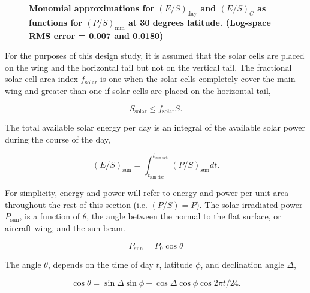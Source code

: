 \documentclass[]{aiaa-tc}%
\begin{document}
\begin{figure}[H]
 \begin{subfigmatrix}{2}%
 \end{subfigmatrix}
 \caption{\textbf{Monomial approximations for $(E/S)_{\text{day}}$ and $(E/S)_C$ as functions for $(P/S)_{\text{min}}$ at 30 degrees latitude. (Log-space RMS error = 0.007 and 0.0180)}}
 \label{f:energyapprox}
\end{figure}

For the purposes of this design study, it is assumed that the solar cells are placed on the wing and the horizontal tail but not on the vertical tail. 
The fractional solar cell area index $f_{\text{solar}}$ is one when the solar cells completely cover the main wing and greater than one if solar cells are placed on the horizontal tail,

\begin{equation}
    \label{e:solarssolar}
    S_{\text{solar}} \leq f_{\text{solar}}S.
\end{equation}

The total available solar energy per day is an integral of the available solar power during the course of the day,

    \begin{equation}
        \label{e:solares}
        (E/S)_{\text{sun}} = \int_{t_{\text{sun rise}}}^{t_{\text{sun set}}} (P/S)_{\text{sun}} dt.
    \end{equation}
    
For simplicity, energy and power will refer to energy and power per unit area throughout the rest of this section (i.e. $(P/S) = P$). 
The solar irradiated power $P_{\text{sun}}$, is a function of $\theta$, the angle between the normal to the flat surface, or aircraft wing, and the sun beam.\cite{solar}

\begin{equation}
    \label{e:solarp}
    P_{\text{sun}} = P_0 \cos{\theta}
\end{equation}

The angle $\theta$, depends on the time of day $t$, latitude $\phi$, and declination angle $\Delta$,\cite{solar}

    \begin{equation}
        \label{e:solartheta}
        \cos{\theta} = \sin{\Delta} \sin{\phi} + \cos{\Delta} \cos{\phi} \cos{2\pi t/24}.
    \end{equation}
\end{document}
